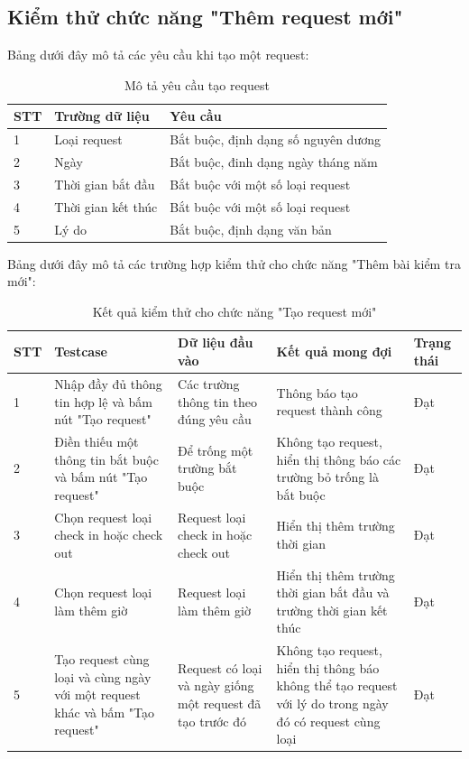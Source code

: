 \documentclass[../DoAn.tex]{subfiles}
\begin{document}
\subsection{Kiểm thử chức năng "Thêm request mới"}

Bảng dưới đây mô tả các yêu cầu khi tạo một request:
\begin{longtable}{|p{}|p{}|p{}|}
\caption{Mô tả yêu cầu tạo request}
\label{fig:AddInterview}
\hline
\textbf{STT} & \textbf{Trường dữ liệu} & \textbf{Yêu cầu}\\ \hline
1 & Loại request & Bắt buộc, định dạng số nguyên dương \\ \hline
2 & Ngày & Bắt buộc, đinh dạng ngày tháng năm \\ \hline
3 & Thời gian bắt đầu & Bắt buộc với một số loại request  \\ \hline
4 & Thời gian kết thúc & Bắt buộc với một số loại request  \\ \hline
5 & Lý do & Bắt buộc, định dạng văn bản  \\ \hline
\end{longtable}
Bảng dưới đây mô tả các trường hợp kiểm thử cho chức năng "Thêm bài kiểm tra mới":

\begin{longtable}{|p{}|p{}|p{}|p{}|p{}|}
\caption{Kết quả kiểm thử cho chức năng "Tạo request mới"}
\hline
\textbf{STT} & \textbf{Testcase} & \textbf{Dữ liệu đầu vào} & \textbf{Kết quả mong đợi} & \textbf{Trạng thái} \\ \hline
1 & Nhập đầy đủ thông tin hợp lệ và bấm nút "Tạo request" & Các trường thông tin theo đúng yêu cầu & Thông báo tạo request thành công & Đạt \\ \hline
2 & Điền thiếu một thông tin bắt buộc và bấm nút "Tạo request" & Để trống một trường bắt buộc & Không tạo request, hiển thị thông báo các trường bỏ trống là bắt buộc & Đạt \\ \hline
3 & Chọn request loại check in hoặc check out & Request loại check in hoặc check out & Hiển thị thêm trường thời gian & Đạt \\ \hline
4 & Chọn request loại làm thêm giờ & Request loại làm thêm giờ & Hiển thị thêm trường thời gian bắt đầu và trường thời gian kết thúc & Đạt \\ \hline
5 & Tạo request cùng loại và cùng ngày với một request khác và bấm "Tạo request" & Request có loại và ngày giống một request đã tạo trước đó & Không tạo request, hiển thị thông báo không thể tạo request với lý do trong ngày đó có request cùng loại & Đạt \\ \hline
\end{longtable}
\end{document}

